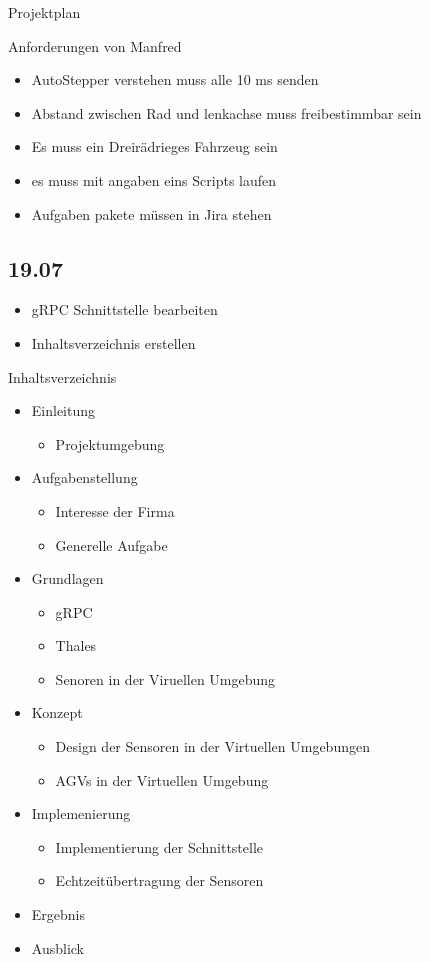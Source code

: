 Projektplan



Anforderungen von Manfred
\begin{itemize}
\item AutoStepper verstehen muss alle 10 ms senden
\item Abstand zwischen Rad und lenkachse muss freibestimmbar sein
\item Es muss ein Dreirädrieges Fahrzeug sein
\item es muss mit angaben eins Scripts laufen 
\item Aufgaben pakete müssen in Jira stehen
\end{itemize}

\subsection{19.07}
\begin{itemize}
\item gRPC Schnittstelle bearbeiten
\item Inhaltsverzeichnis erstellen
\end{itemize}

Inhaltsverzeichnis
\begin{itemize}
\item Einleitung
\begin{itemize}
\item Projektumgebung
\end{itemize}
\item Aufgabenstellung
\begin{itemize}
\item Interesse der Firma
\item Generelle Aufgabe
\end{itemize}
\item Grundlagen
\begin{itemize}
\item gRPC 
\item Thales
\item Senoren in der Viruellen Umgebung
\end{itemize}
\item Konzept
\begin{itemize}
\item Design der Sensoren in der Virtuellen Umgebungen 
\item AGVs in der Virtuellen Umgebung
\end{itemize}
\item Implemenierung
\begin{itemize}
\item Implementierung der Schnittstelle
\item Echtzeitübertragung der Sensoren
\end{itemize}
\item Ergebnis
\item Ausblick
\end{itemize}


